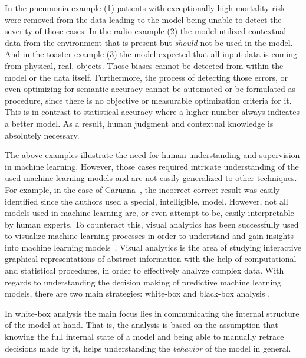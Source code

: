 In the pneumonia example (1) patients with exceptionally high mortality risk were removed from the data leading to the model being unable to detect the severity of those cases.
In the radio example (2) the model utilized contextual data from the environment that is present but \emph{should} not be used in the model.
And in the toaster example (3) the model expected that all input data is coming from physical, real, objects.
Those biases cannot be detected from within the model or the data itself.
Furthermore, the process of detecting those errors, or even optimizing for semantic accuracy cannot be automated or be formulated as procedure, since there is no objective or measurable optimization criteria for it.
This is in contrast to statistical accuracy where a higher number always indicates a better model.
As a result, human judgment and contextual knowledge is absolutely necessary.

The above examples illustrate the need for human understanding and supervision in machine learning.
However, those cases required intricate understanding of the used machine learning models and are not easily generalized to other techniques.
For example, in the case of Caruana~\etal\cite{Caruana:2015:IMH:2783258.2788613}, the incorrect correct result was easily identified since the authors used a special, intelligible, model.
However, not all models used in machine learning are, or even attempt to be, easily interpretable by human experts.
To counteract this, visual analytics has been successfully used to visualize machine learning processes in order to understand and gain insights into machine learning models~\cite{DBLP:journals/corr/StrobeltGHPR16,DBLP:journals/corr/abs-1710-06501,2017arXiv170401942K,DBLP:journals/corr/abs-1710-10777,8019879,8019872,DBLP:journals/tvcg/LiuXLWWZ18,8019878}. Visual analytics is the area of studying interactive graphical representations of abstract information with the help of computational and statistical procedures, in order to effectively analyze complex data. With regards to understanding the decision making of predictive machine learning models, there are two main strategies: white-box and black-box analysis \cite{class_signatures}.

In white-box analysis the main focus lies in communicating the internal structure of the model at hand. That is, the analysis is based on the assumption that knowing the full internal state of a model and being able to manually retrace decisions made by it, helps understanding the \emph{behavior} of the model in general.

